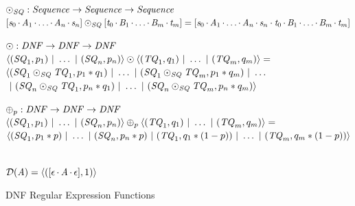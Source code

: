\documentclass[acmsmall,screen,anonymous]{acmart}
\begin{document}
\begin{figure}
  \raggedright
  $\odot_{\mathit{SQ}}{} :{} \mathit{Sequence}{} \rightarrow \mathit{Sequence}{} \rightarrow \mathit{Sequence}{}$\\
  $[\mathit{s}_0\mkern-1mu\cdot\mkern-1mu\mathit{A}_1\mkern-1mu\cdot\mkern-1mu\ldots\mkern-1mu\cdot\mkern-1mu\mathit{A}_n\mkern-1mu\cdot\mkern-1mu\mathit{s}_n]\odot_{\mathit{SQ}}[\mathit{t}_0\mkern-1mu\cdot\mkern-1mu\mathit{B}_1\mkern-1mu\cdot\mkern-1mu\ldots\mkern-1mu\cdot\mkern-1mu\mathit{B}_m\mkern-1mu\cdot\mkern-1mu\mathit{t}_m]=
  [\mathit{s}_0\mkern-1mu\cdot\mkern-1mu\mathit{A}_1\mkern-1mu\cdot\mkern-1mu\ldots\mkern-1mu\cdot\mkern-1mu\mathit{A}_n\mkern-1mu\cdot\mkern-1mu\mathit{s}_n\cdot\mathit{t}_0\mkern-1mu\cdot\mkern-1mu\mathit{B}_1\mkern-1mu\cdot\mkern-1mu\ldots\mkern-1mu\cdot\mkern-1mu\mathit{B}_m\mkern-1mu\cdot\mkern-1mu\mathit{t}_m]$\\

  \medskip
  
  $\odot{} :{} \mathit{DNF}{} \rightarrow \mathit{DNF}{} \rightarrow \mathit{DNF}{}$\\
  $\langle(\mathit{SQ}_1,p_1)~|~\ldots~|~(\mathit{SQ}_n,p_n)\rangle\odot\langle(\mathit{TQ}_1,q_1)~|~\ldots~|~(\mathit{TQ}_m,q_m)\rangle=$\\
      $\langle (\mathit{SQ}_1\odot_{\mathit{SQ}}\mathit{TQ}_1,p_1*q_1)~|~ \ldots
      ~|~
      (\mathit{SQ}_1\odot_{\mathit{SQ}}\mathit{TQ}_m,p_1*q_m)~|~
      \ldots$\\
      $~|~
      (\mathit{SQ}_n\odot_{\mathit{SQ}}\mathit{TQ}_1,p_n*q_1)~|~
      \ldots ~|~
      (\mathit{SQ}_n\odot_{\mathit{SQ}}\mathit{TQ}_m,p_n * q_m) \rangle$
  
  \medskip
  
  $\oplus{}_{p} :{}
  \mathit{DNF}{} \rightarrow \mathit{DNF}{} \rightarrow \mathit{DNF}{}
  $ \\
  $\langle(\mathit{SQ}_1,p_1)~|~\ldots~|~(\mathit{SQ}_n,p_n)\rangle\oplus_{p}\langle(\mathit{TQ}_1,q_1)~|~\ldots~|~(\mathit{TQ}_m,q_m)\rangle =$\\
  $\langle(\mathit{SQ}_1,p_1*p)~|~\ldots~|~(\mathit{SQ}_n,p_n*p)~|~(\mathit{TQ}_1,q_1*(1-p))~|~\ldots~|~(\mathit{TQ}_m,q_m*(1-p))\rangle$
  
  \medskip
  
  \AtomToDNF{} \OfType
  \ArrowTypeOf{\AtomType{}}{\DNFRegexType{}}\\
  $\mathcal{D}(\mathit{A}) = \langle([\epsilon \mkern-1mu\cdot\mkern-1mu \mathit{A} \mkern-1mu\cdot\mkern-1mu
      \epsilon],1)\rangle$
  \caption{DNF Regular Expression Functions}
  \label{fig:dnf-regex-functions}
\end{figure}
\end{document}
